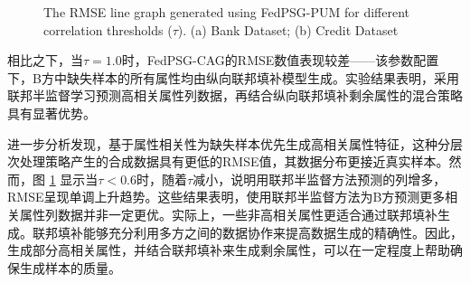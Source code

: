 \vspace{-0.1cm}
\begin{figure}[h]
	\centering
	\hspace{0.01\textwidth}  %
	
	{\centering \wuhao The RMSE line graph generated using FedPSG-PUM for different correlation thresholds ($\tau$). (a) Bank Dataset; (b) Credit Dataset}    
	\label{Chapter4Exp1Setting1}
\end{figure}
\vspace{-0.35cm}

相比之下，当$\tau = 1.0$时，FedPSG-CAG的RMSE数值表现较差——该参数配置下，B方中缺失样本的所有属性均由纵向联邦填补模型生成。实验结果表明，采用联邦半监督学习预测高相关属性列数据，再结合纵向联邦填补剩余属性的混合策略具有显著优势。

进一步分析发现，基于属性相关性为缺失样本优先生成高相关属性特征，这种分层次处理策略产生的合成数据具有更低的RMSE值，其数据分布更接近真实样本。然而，图 \ref{Chapter4Exp1Setting1} 显示当$\tau < 0.6 $时，随着$\tau$减小，说明用联邦半监督方法预测的列增多，RMSE呈现单调上升趋势。这些结果表明，使用联邦半监督方法为B方预测更多相关属性列数据并非一定更优。实际上，一些非高相关属性更适合通过联邦填补生成。联邦填补能够充分利用多方之间的数据协作来提高数据生成的精确性。因此，生成部分高相关属性，并结合联邦填补来生成剩余属性，可以在一定程度上帮助确保生成样本的质量。

